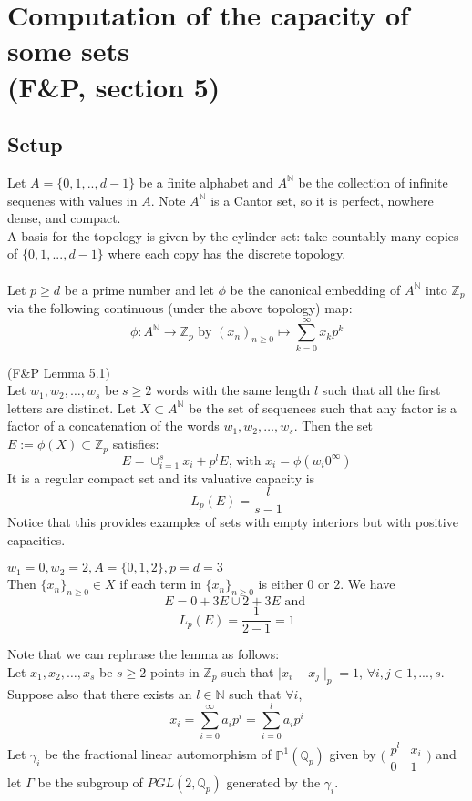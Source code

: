 \section*{Computation of the capacity of some sets\\ (F\&P, section 5)}
\subsection*{Setup}
Let $A=\{0,1,..,d-1\}$ be a finite alphabet and $A^{\mathbb{N}}$ be the collection of infinite sequenes with values in $A$. Note $A^{\mathbb{N}}$ is a Cantor set, so it is perfect, nowhere dense, and compact.  \\

A basis for the topology is given by the cylinder set: take countably many copies of $\{0,1,...,d-1\}$ where each copy has the discrete topology.\\\\ Let $p \geq d$ be a prime number and let $\phi$ be the canonical embedding of $A^\mathbb{N}$ into $\mathbb{Z}_p$ via the following continuous (under the above topology) map: \[ \phi: A^{\mathbb{N}} \rightarrow \mathbb{Z}_p \text{ by } (x_n)_{n\geq0} \mapsto \sum_{k=0}^\infty x_kp^k\]

\begin{lemma*} (F\&P Lemma 5.1)\\ Let $w_1,w_2,\ldots,w_s$ be $s\geq 2$ words with the same length $l$ such that all the first letters are distinct. Let $X \subset A^{\mathbb{N}}$ be the set of sequences such that any factor is a factor of a concatenation of the words $w_1,w_2,\ldots,w_s$. Then the set $E := \phi(X) \subset \mathbb{Z}_p$ satisfies: \[E=\cup_{i=1}^s x_i +p^l E \text{,   with } x_i=\phi(w_i0^\infty)\]
It is a regular compact set and its valuative capacity is \[L_p(E) = \frac{l}{s-1}\] Notice that this provides examples of sets with empty interiors but with positive capacities.
\end{lemma*}
\begin{example}
	$w_1=0, w_2=2,  A=\{0,1,2\}, p=d=3$\\
	Then $\{x_n\}_{n\geq0} \in X$ if each term in  $\{x_n\}_{n\geq0}$ is either $0$ or $2$. We have \[E=0 + 3E \cup 2 + 3E \text{ and }\]  \[L_p(E) = \frac{1}{2-1} =1\] 
\end{example}

Note that we can rephrase the lemma as follows:\\ Let $x_1,x_2,\ldots,x_s$ be $s \geq 2$ points in $\mathbb{Z}_p$ such that $\mid x_i - x_j \mid_p = 1$, $\forall i,j \in 1,...,s$. Suppose also that there exists an $l \in \mathbb{N}$ such that  $\forall i$, $$x_i = \sum_{i=0}^{\infty} a_ip^i = \sum_{i=0}^{l} a_ip^i $$ Let $\gamma_i$ be the fractional linear automorphism of $\mathbb{P}^{1}(\mathbb{Q}_p)$ given by $\bigl( \begin{smallmatrix}p^l & x_i\\ 0 & 1 \end{smallmatrix}\bigr)$ and let $\Gamma$ be the subgroup of $PGL(2,\mathbb{Q}_p)$ generated by the $\gamma_i$. \\

